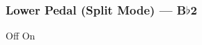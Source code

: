 \subsubsection[Lower Pedal (Split Mode)]{Lower Pedal (Split Mode) --- \UiKey{\SET}B$\flat$2}









































Off
On

